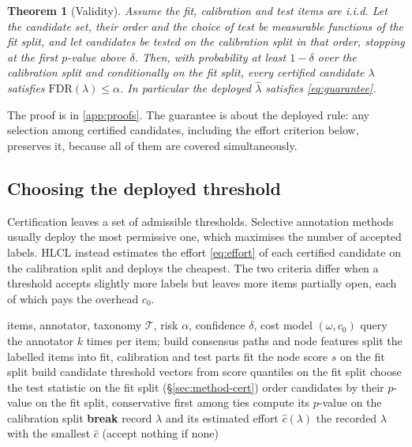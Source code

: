 \documentclass[preprint,12pt]{elsarticle}
\newtheorem{theorem}{Theorem}
\theoremstyle{definition}
\theoremstyle{remark}
\newcommand{\hlcl}{\textup{\textsc{HLCL}}}
\newcommand{\fdr}{\mathrm{FDR}}
\begin{document}
\begin{theorem}[Validity]
\label{thm:validity}
Assume the fit, calibration and test items are i.i.d. Let the candidate set,
their order and the choice of test be measurable functions of the fit split,
and let candidates be tested on the calibration split in that order, stopping at
the first $p$-value above $\delta$. Then, with probability at least $1-\delta$
over the calibration split and conditionally on the fit split, every certified
candidate $\lambda$ satisfies $\fdr(\lambda)\le\alpha$. In particular the
deployed $\hat\lambda$ satisfies \eqref{eq:guarantee}.
\end{theorem}

The proof is in \ref{app:proofs}. The guarantee is about the deployed rule: any
selection among certified candidates, including the effort criterion below,
preserves it, because all of them are covered simultaneously.

\subsection{Choosing the deployed threshold}
\label{sec:method-select}

Certification leaves a set of admissible thresholds. Selective annotation
methods usually deploy the most permissive one, which maximises the number of
accepted labels. \hlcl{} instead estimates the effort \eqref{eq:effort} of each
certified candidate on the calibration split and deploys the cheapest. The two
criteria differ when a threshold accepts slightly more labels but leaves more
items partially open, each of which pays the overhead $c_0$.

\begin{algorithm}[t]
\caption{\hlcl{}}
\label{alg:hlcl}
\begin{algorithmic}[1]
\Require items, annotator, taxonomy $\mathcal{T}$, risk $\alpha$, confidence
$\delta$, cost model $(\omega,c_0)$
\State query the annotator $k$ times per item; build consensus paths and node features
\State split the labelled items into fit, calibration and test parts
\State fit the node score $s$ on the fit split
\State build candidate threshold vectors from score quantiles on the fit split
\State choose the test statistic on the fit split (\S\ref{sec:method-cert})
\State order candidates by their $p$-value on the fit split, conservative first among ties
  \State compute its $p$-value on the calibration split
   \textbf{break}
  \EndIf
  \State record $\lambda$ and its estimated effort $\hat c(\lambda)$
\EndFor
\State \Return the recorded $\lambda$ with the smallest $\hat c$ (accept nothing if none)
\end{algorithmic}
\end{algorithm}
\end{document}
